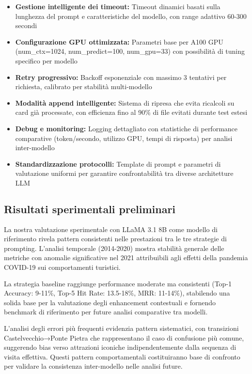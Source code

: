 \begin{itemize}
\begin{itemize}
\item \textbf{Gestione intelligente dei timeout:} Timeout dinamici basati sulla lunghezza del prompt e caratteristiche del modello, con range adattivo 60-300 secondi
\item \textbf{Configurazione GPU ottimizzata:} Parametri base per A100 GPU (num\_ctx=1024, num\_predict=100, num\_gpu=33) con possibilità di tuning specifico per modello
\item \textbf{Retry progressivo:} Backoff esponenziale con massimo 3 tentativi per richiesta, calibrato per stabilità multi-modello
\item \textbf{Modalità append intelligente:} Sistema di ripresa che evita ricalcoli su card già processate, con efficienza fino al 90\% di file evitati durante test estesi
\item \textbf{Debug e monitoring:} Logging dettagliato con statistiche di performance comparative (token/secondo, utilizzo GPU, tempi di risposta) per analisi inter-modello
\item \textbf{Standardizzazione protocolli:} Template di prompt e parametri di valutazione uniformi per garantire confrontabilità tra diverse architetture LLM
\end{itemize}

\subsection{Risultati sperimentali preliminari}

La nostra valutazione sperimentale con LLaMA 3.1 8B come modello di riferimento rivela pattern consistenti nelle prestazioni tra le tre strategie di prompting. L'analisi temporale (2014-2020) mostra stabilità generale delle metriche con anomalie significative nel 2021 attribuibili agli effetti della pandemia COVID-19 sui comportamenti turistici.

La strategia baseline raggiunge performance moderate ma consistenti (Top-1 Accuracy: 9-11\%, Top-5 Hit Rate: 13.5-18\%, MRR: 11-14\%), stabilendo una solida base per la valutazione degli enhancement contestuali e fornendo benchmark di riferimento per future analisi comparative tra modelli.

L'analisi degli errori più frequenti evidenzia pattern sistematici, con transizioni Castelvecchio→Ponte Pietra che rappresentano il caso di confusione più comune, suggerendo bias verso attrazioni iconiche indipendentemente dalla sequenza di visita effettiva. Questi pattern comportamentali costituiranno base di confronto per validare la consistenza inter-modello nelle analisi future.


\end{itemize}
